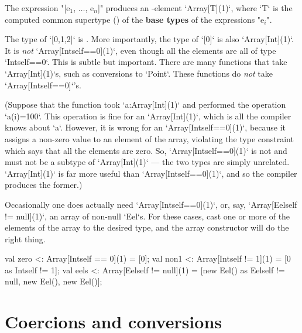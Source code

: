 The expression \xcdmath"[e$_1$, $\ldots$, e$_n$]" produces an -element
\xcd`Array[T](1)`, where \xcd`T` is the computed common supertype () of the {\bf
base types} of the expressions  \xcdmath"e$_i$". 

\begin{ex}
The type of
\xcd`[0,1,2]` is .    
More importantly, the type of 
\xcd`[0]` is also \xcd`Array[Int](1)`.  It is {\em not} 
\xcd`Array[Int{self==0}](1)`, even though all the elements are all 
of type \xcd`Int{self==0}`.  This is subtle but important. There are many
functions that take \xcd`Array[Int](1)`s, such as conversions to \xcd`Point`.
These functions do {\em not} take
\xcd`Array[Int{self==0}]`'s.

(Suppose that the function took \xcd`a:Array[Int](1)` and 
performed 
the operation \xcd`a(i)=100`.   This operation is fine for
an \xcd`Array[Int](1)`, which is all the compiler knows about \xcd`a`.  
However, it is wrong for an \xcd`Array[Int{self==0}](1)`, because it assigns
a non-zero value to an element of the array, violating the type constraint
which says that all the elements are zero.  So, \xcd`Array[Int{self==0}](1)`
is not and must not be a subtype of \xcd`Array[Int](1)` --- the two types are simply unrelated.
\xcd`Array[Int](1)` is far more useful than 
\xcd`Array[Int{self==0}](1)`, and so the compiler produces the former.)
\end{ex}



\begin{ex}
Occasionally one does actually need \xcd`Array[Int{self==0}](1)`, 
or, say, \xcd`Array[Eel{self != null}](1)`, an array of non-null \xcd`Eel`s.  
For these cases, cast one or more of the elements of the array to the desired type,
and the array constructor will do the right thing.  
\begin{xten}
val zero <: Array[Int{self == 0}](1) 
          = [0];
val non1 <: Array[Int{self != 1}](1) 
          = [0 as Int{self != 1}];
val eels <: Array[Eel{self != null}](1) 
          = [new Eel() as Eel{self != null}, 
             new Eel(), new Eel()];
\end{xten}
\end{ex}


\section{Coercions and conversions}
\label{XtenConversions}
\label{User-definedCoercions}


